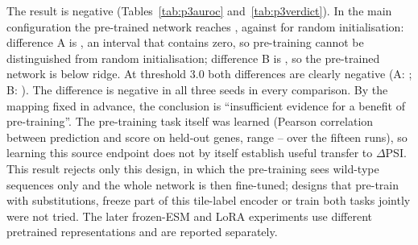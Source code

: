 The result is negative (Tables~\ref{tab:p3auroc} and~\ref{tab:p3verdict}). In the main configuration the pre-trained network reaches
\nPtExtPre{}, against \nPtExtRand{} for random initialisation: difference A is \nPtExtA{} \nPtExtACI{}, an interval that contains zero,
so pre-training cannot be distinguished from random initialisation; difference B is \nPtExtB{} \nPtExtBCI{}, so the pre-trained network
is below ridge. At threshold 3.0 both differences are clearly negative (A: \nPtBaseA{} \nPtBaseACI{}; B: \nPtBaseB{} \nPtBaseBCI{}).
The difference is negative in all three seeds in every comparison. By the mapping fixed in advance, the conclusion is
``insufficient evidence for a benefit of pre-training''. The pre-training task itself was learned (Pearson correlation
\nPtPearson{} between prediction and score on held-out genes, range \nPtPearsonLo{}--\nPtPearsonHi{} over the fifteen runs), so learning this source endpoint does not by itself
establish useful transfer to $\Delta$PSI. This result rejects only this design, in which the
pre-training sees wild-type sequences only and the whole network is then fine-tuned; designs that pre-train with
substitutions, freeze part of this tile-label encoder or train both tasks jointly were not tried.
The later frozen-ESM and LoRA experiments use different pretrained representations and are reported separately.

\begin{table}[htbp]
  \centering
  \caption[Pre-registered comparisons for pre-training]{Pre-registered comparisons for pre-training. The main configuration is the relaxed threshold 4.0; the threshold 3.0 is
  reported with the same criteria and was not used to choose the configuration.}\label{tab:p3verdict}
  
\end{table}


\begin{table}[htbp]
  \centering
  \caption{Macro AUROC with and without pre-training on tile labels}\label{tab:p3auroc}
  
\end{table}



